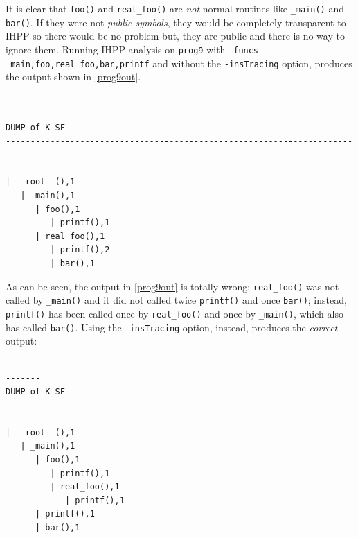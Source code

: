 \documentclass[a4paper,10pt]{report}
\begin{document}
\noindent
It is clear that \verb|foo()| and \verb|real_foo()| are \emph{not} normal routines
like \verb|_main()| and \verb|bar()|. 
If they were not \emph{public symbols}, they would be completely transparent to IHPP 
so there would be no problem but, they are public and there is no way to ignore them.
Running IHPP analysis on \verb|prog9| with \verb|-funcs| \verb|_main,foo,real_foo,bar,printf| and without the \verb|-insTracing| option, produces the output shown in \cref{prog9out}.
\begin{lstlisting}[label=prog9out, caption={IHPP output without \emph{insTracing}}, frame=leftline, showstringspaces=false]
-----------------------------------------------------------------------------
DUMP of K-SF
-----------------------------------------------------------------------------

| __root__(),1
   | _main(),1
      | foo(),1
         | printf(),1
      | real_foo(),1
         | printf(),2
         | bar(),1
\end{lstlisting}

\noindent
As can be seen, the output in \cref{prog9out} is totally wrong: 
\verb|real_foo()| was not called by \verb|_main()| and it did not called twice \verb|printf()|
and once \verb|bar()|; instead, \verb|printf()| has been called once by \verb|real_foo()|
and once by \verb|_main()|, which also has called \verb|bar()|.
Using the \verb|-insTracing| option, instead, produces the \emph{correct} output:

\begin{lstlisting}[label=prog9out2, caption={IHPP output with \emph{insTracing}}, frame=leftline, showstringspaces=false]
-----------------------------------------------------------------------------
DUMP of K-SF
-----------------------------------------------------------------------------
| __root__(),1
   | _main(),1
      | foo(),1
         | printf(),1
         | real_foo(),1
            | printf(),1
      | printf(),1
      | bar(),1
\end{lstlisting}
\end{document}
